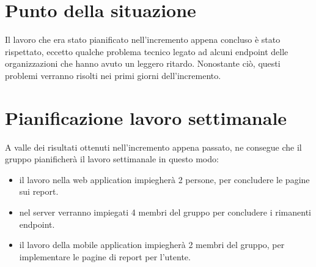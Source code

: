 \documentclass{article}
\begin{document}
\section{Punto della situazione}%
\label{sec:punto_della_situazione}
Il lavoro che era stato pianificato nell'incremento appena concluso è stato rispettato, eccetto qualche problema tecnico legato ad alcuni endpoint delle organizzazioni che hanno avuto un leggero ritardo. Nonostante ciò, questi problemi verranno risolti nei primi giorni dell'incremento.

\section{Pianificazione lavoro settimanale}%
\label{sec:pianificazione_lavoro_settimanale}
A valle dei risultati ottenuti nell'incremento appena passato, ne consegue che il gruppo pianificherà il lavoro settimanale in questo modo:
\begin{itemize}
  \item il lavoro nella web application impiegherà 2 persone, per concludere le pagine sui report.
  \item nel server verranno impiegati 4 membri del gruppo per concludere i rimanenti endpoint.
  \item il lavoro della mobile application impiegherà 2 membri del gruppo, per implementare le pagine di report per l'utente.
\end{itemize}
\end{document}
